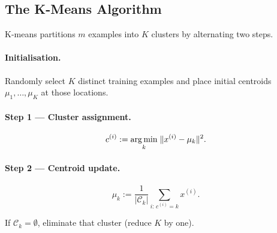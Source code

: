 \subsection{The K-Means Algorithm}

K-means partitions $m$ examples into $K$ clusters by alternating two steps.

\paragraph{Initialisation.} Randomly select $K$ distinct training examples and
place initial centroids $\mu_1,\ldots,\mu_K$ at those locations.

\paragraph{Step 1 --- Cluster assignment.}
\[c^{(i)}:=\underset{k}{\operatorname*{arg\,min}}\;\|x^{(i)}-\mu_k\|^2.\]

\paragraph{Step 2 --- Centroid update.}
\[\mu_k:=\frac{1}{|\mathcal{C}_k|}\sum_{i:\,c^{(i)}=k}x^{(i)}.\]

If $\mathcal{C}_k=\emptyset$, eliminate that cluster (reduce $K$ by one).

